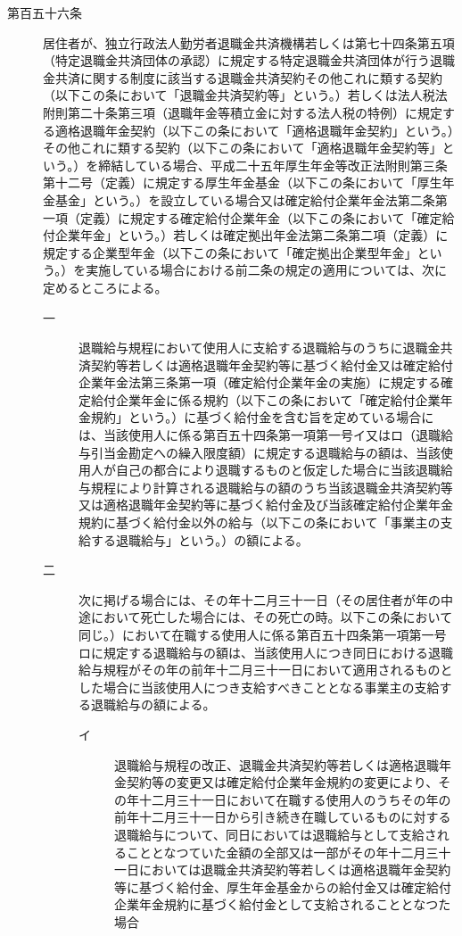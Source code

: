 \documentclass[twocolumn,a4j,10pt]{ltjtarticle}
\begin{document}
\begin{description}
\item[第百五十六条]居住者が、独立行政法人勤労者退職金共済機構若しくは第七十四条第五項（特定退職金共済団体の承認）に規定する特定退職金共済団体が行う退職金共済に関する制度に該当する退職金共済契約その他これに類する契約（以下この条において「退職金共済契約等」という。）若しくは法人税法附則第二十条第三項（退職年金等積立金に対する法人税の特例）に規定する適格退職年金契約（以下この条において「適格退職年金契約」という。）その他これに類する契約（以下この条において「適格退職年金契約等」という。）を締結している場合、平成二十五年厚生年金等改正法附則第三条第十二号（定義）に規定する厚生年金基金（以下この条において「厚生年金基金」という。）を設立している場合又は確定給付企業年金法第二条第一項（定義）に規定する確定給付企業年金（以下この条において「確定給付企業年金」という。）若しくは確定拠出年金法第二条第二項（定義）に規定する企業型年金（以下この条において「確定拠出企業型年金」という。）を実施している場合における前二条の規定の適用については、次に定めるところによる。
\begin{description}
\item[一]退職給与規程において使用人に支給する退職給与のうちに退職金共済契約等若しくは適格退職年金契約等に基づく給付金又は確定給付企業年金法第三条第一項（確定給付企業年金の実施）に規定する確定給付企業年金に係る規約（以下この条において「確定給付企業年金規約」という。）に基づく給付金を含む旨を定めている場合には、当該使用人に係る第百五十四条第一項第一号イ又はロ（退職給与引当金勘定への繰入限度額）に規定する退職給与の額は、当該使用人が自己の都合により退職するものと仮定した場合に当該退職給与規程により計算される退職給与の額のうち当該退職金共済契約等又は適格退職年金契約等に基づく給付金及び当該確定給付企業年金規約に基づく給付金以外の給与（以下この条において「事業主の支給する退職給与」という。）の額による。
\item[二]次に掲げる場合には、その年十二月三十一日（その居住者が年の中途において死亡した場合には、その死亡の時。以下この条において同じ。）において在職する使用人に係る第百五十四条第一項第一号ロに規定する退職給与の額は、当該使用人につき同日における退職給与規程がその年の前年十二月三十一日において適用されるものとした場合に当該使用人につき支給すべきこととなる事業主の支給する退職給与の額による。
\begin{description}
\item[イ]退職給与規程の改正、退職金共済契約等若しくは適格退職年金契約等の変更又は確定給付企業年金規約の変更により、その年十二月三十一日において在職する使用人のうちその年の前年十二月三十一日から引き続き在職しているものに対する退職給与について、同日においては退職給与として支給されることとなつていた金額の全部又は一部がその年十二月三十一日においては退職金共済契約等若しくは適格退職年金契約等に基づく給付金、厚生年金基金からの給付金又は確定給付企業年金規約に基づく給付金として支給されることとなつた場合

\end{description}
\end{description}
\end{description}
\end{document}
